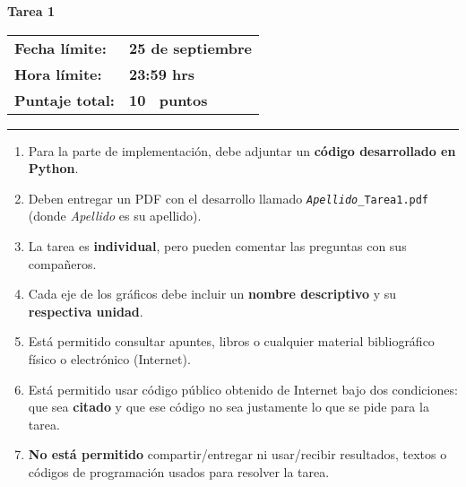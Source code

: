 \documentclass[letterpaper, 12pt]{article}
\makeatletter
\newcommand{\configurartarea}[6]{
  \newcommand{\numeroTarea}{#1}
  \newcommand{\fechaEntrega}{#2}
  \newcommand{\horaEntrega}{#3}
  \newcommand{\semestreTarea}{#4}
  \newcommand{\profesorTarea}{#5}
  \newcommand{\puntajeTarea}{#6}
}
\newcommand{\tituloTarea}{%
  \vspace{2.5cm}
  \begin{center}
    {\Huge\bfseries Tarea \numeroTarea}
    
    \vspace{0.8cm}
    
    \begin{tcolorbox}[
      colback=white,
      colframe=black,
      boxrule=1pt,
      rounded corners=5pt,
      center,
      fonttitle=\large\bfseries,
      title={INFORMACIÓN DE ENTREGA}
    ]
      \begin{tabularx}{0.8\textwidth}{@{}X@{\hspace{1cm}}X@{}}
        \textbf{\Large Fecha límite:} & \textbf{\Large \fechaEntrega} \\[0.3cm]
        \textbf{\Large Hora límite:} & \textbf{\Large \horaEntrega} \\[0.3cm]
        \textbf{\Large Puntaje total:} & \textbf{\Large \puntajeTarea\ puntos} \\
      \end{tabularx}
    \end{tcolorbox}
    
    \vspace{0.5cm}
    
    \rule{\textwidth}{1.5pt}
  \end{center}
  
  \vspace{1cm}
}
\newenvironment{instrucciones}{%
  \begin{tcolorbox}[
    enhanced,
    colback=black!5, %
    colframe=black,
    boxrule=1pt,
    rounded corners=8pt,
    left=15pt,
    right=15pt,
    top=12pt,
    bottom=12pt,
    title={\textbf{\Large INSTRUCCIONES GENERALES}},
    fonttitle=\bfseries\color{black}
  ]
  \begin{enumerate}[leftmargin=25pt, itemsep=8pt]
}{%
  \end{enumerate}
  \end{tcolorbox}
}
\makeatother
\begin{document}
\configurartarea{
  1  %
}{
  25 de septiembre  %
}{
  23:59 hrs  %
}{
  2024-2  %
}{
  Patricio de la Cuadra  %
}{
  10  %
}

\tituloTarea

\begin{instrucciones}
  \item Para la parte de implementación, debe adjuntar un \textbf{código desarrollado en Python}.
  
  \item Deben entregar un PDF con el desarrollo llamado \texttt{\textit{Apellido}\_Tarea1.pdf} (donde \textit{Apellido} es su apellido).
  
  \item La tarea es \textbf{individual}, pero pueden comentar las preguntas con sus compañeros.
  
  \item Cada eje de los gráficos debe incluir un \textbf{nombre descriptivo} y su \textbf{respectiva unidad}.
  
  \item Está permitido consultar apuntes, libros o cualquier material bibliográfico físico o electrónico (Internet).
  
  \item Está permitido usar código público obtenido de Internet bajo dos condiciones: que sea \textbf{citado} y que ese código no sea justamente lo que se pide para la tarea.
  
  \item \textbf{No está permitido} compartir/entregar ni usar/recibir resultados, textos o códigos de programación usados para resolver la tarea.
\end{instrucciones}
\end{document}
